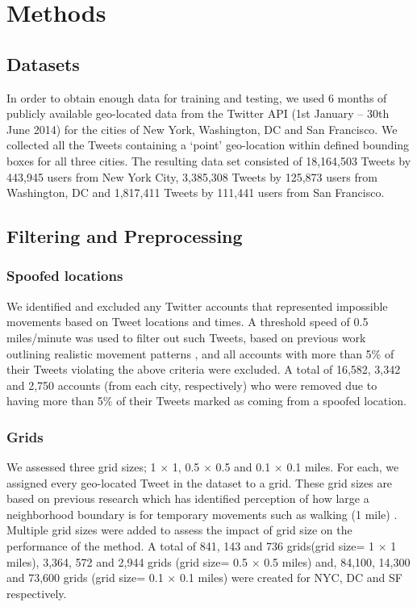 \section{Methods}
\subsection{Datasets}
In order to obtain enough data for training and testing, we used 6 months of publicly available geo-located data from the Twitter API (1st January -- 30th June 2014) for the cities of New York, Washington, DC and San Francisco. We collected all the Tweets containing a `point' geo-location within defined bounding boxes for all three cities. %
The resulting data set consisted of 18,164,503 Tweets by 443,945 users from New York City, 3,385,308 Tweets by 125,873 users from Washington, DC and 1,817,411 Tweets by 111,441 users from San Francisco.
\subsection{Filtering and Preprocessing}
\subsubsection{Spoofed locations}
We identified and excluded any Twitter accounts that represented impossible movements based on Tweet locations and times. A threshold speed of 0.5 miles/minute was used to filter out such Tweets, based on previous work outlining realistic movement patterns \cite{79}, and all accounts with more than 5\% of their Tweets violating the above criteria were excluded. 
A total of 16,582, 3,342 and 2,750 accounts (from each city, respectively) who were removed due to having more than 5\% of their Tweets marked as coming from a spoofed location.
\subsubsection{Grids}
We assessed three grid sizes; 1 $\times$ 1, 0.5 $\times$ 0.5 and 0.1 $\times$ 0.1 miles. For each, we assigned every geo-located Tweet in the dataset to a grid. These grid sizes are based on previous research which has identified perception of how large a neighborhood boundary is for temporary movements such as walking (1 mile) \cite{85,127}. %
Multiple grid sizes were added to assess the impact of grid size on the performance of the method.
A total of 841, 143 and 736 grids(grid size= 1 $\times$ 1 miles), 3,364, 572 and 2,944 grids (grid size= 0.5 $\times$ 0.5 miles) and,  84,100, 14,300 and 73,600 grids (grid size= 0.1 $\times$ 0.1 miles) were created for NYC, DC and SF respectively.
